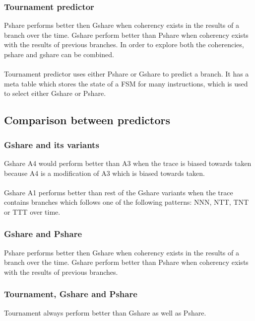 \documentclass[a4paper]{article}
\begin{document}
        \subsubsection{Tournament predictor}
            Pshare performs better then Gshare when coherency exists in the results of a branch over the time. Gshare perform better than Pshare when coherency exists with the results of previous branches. In order to explore both the coherencies, pshare and gshare can be combined.\\  
            \\Tournament predictor uses either Pshare or Gshare to predict a branch. It has a meta table which stores the state of a FSM for many instructions, which is used to select either Gshare or Pshare.\\
    \subsection{Comparison between predictors}
        \subsubsection{Gshare and its variants}
            Gshare  A4 would perform better than A3 when the trace is biased towards  taken because A4 is a modification of A3 which is biased towards taken.\\
            \\Gshare A1 performs better than rest of the Gshare variants when the trace contains branches which follows one of the following patterns: NNN, NTT, TNT or TTT over time.
        \subsubsection{Gshare and Pshare}
            Pshare performs better then Gshare when coherency exists in the results of a branch over the time. Gshare perform better than Pshare when coherency exists with the results of previous branches.
        \subsubsection{Tournament, Gshare and Pshare}
            Tournament always perform better than Gshare as well as Pshare.\\
\end{document}
